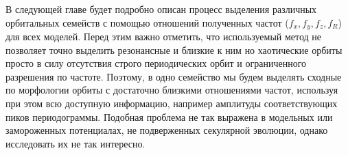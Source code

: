\documentclass{trlnotes}
\begin{document}
В следующей главе будет подробно описан процесс выделения различных орбитальных семейств с помощью отношений
полученных частот ($f_x, f_y, f_z, f_R$) для всех моделей. Перед этим важно отметить, что используемый метод не
позволяет точно выделить резонансные и близкие к ним но хаотические орбиты просто в силу отсутствия строго
периодических орбит и  ограниченного разрешения по частоте. Поэтому, в одно семейство мы будем выделять сходные по
морфологии орбиты с достаточно близкими отношениями частот, используя при этом всю доступную информацию, например
амплитуды соответствующих пиков периодограммы. Подобная проблема не так выражена в модельных или замороженных
потенциалах, не подверженных секулярной эволюции\quest,
однако исследовать их не так интересно.  
\end{document}
